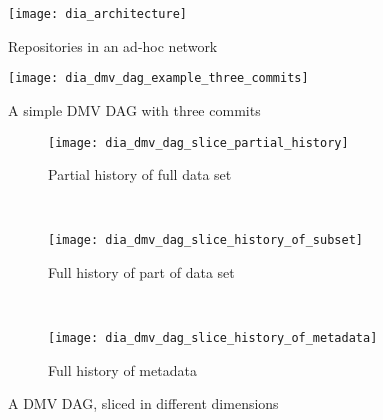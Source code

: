 \documentclass[usenglish]{nik}
\begin{document}

\begin{figure}[]
    \centering
    \texttt{[image: dia\_architecture]}
    \caption{Repositories in an ad-hoc network}
    \label{fig:dia_architecture}
\end{figure}

\begin{figure}[]
    \centering
    \texttt{[image: dia\_dmv\_dag\_example\_three\_commits]}
    \caption{A simple DMV DAG with three commits}
    \label{dia_dmv_dag_example_three_commits}
\end{figure}


\newcommand{\slicediagramwidth}{0.45\textwidth}

\begin{figure}[]

    \centering

    \begin{subfigure}[]{\slicediagramwidth}
        \texttt{[image: dia\_dmv\_dag\_slice\_partial\_history]}
        \caption{Partial history of full data set}
        \label{dia_dmv_dag_slice_partial_history}
    \end{subfigure}
    ~
    \begin{subfigure}[]{\slicediagramwidth}
        \texttt{[image: dia\_dmv\_dag\_slice\_history\_of\_subset]}
        \caption{Full history of part of data set}
        \label{dia_dmv_dag_slice_history_of_subset}
    \end{subfigure}
    ~
    \begin{subfigure}[]{\slicediagramwidth}
        \texttt{[image: dia\_dmv\_dag\_slice\_history\_of\_metadata]}
        \caption{Full history of metadata}
        \label{dia_dmv_dag_slice_history_of_metadata}
    \end{subfigure}

    \caption{A DMV DAG, sliced in different dimensions}
\end{figure}
\end{document}
